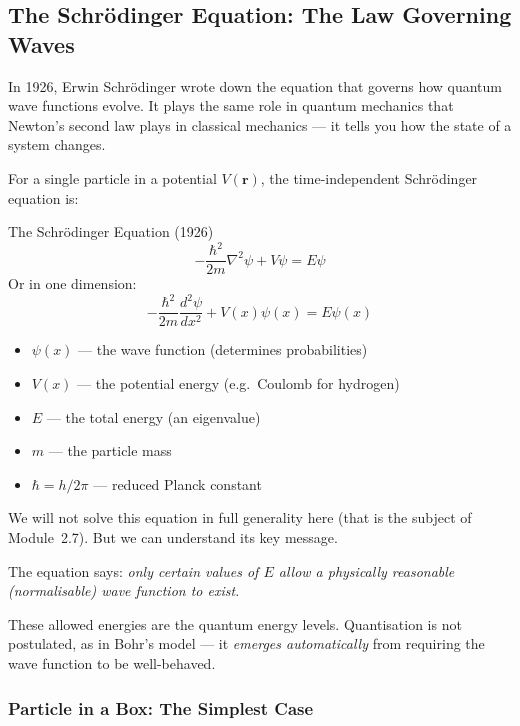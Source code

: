 \documentclass[12pt, a4paper]{book}
\begin{document}
\subsection{The Schr\"{o}dinger Equation: The Law Governing Waves}

In 1926, Erwin Schr\"{o}dinger wrote down the equation
that governs how quantum wave functions evolve.
It plays the same role in quantum mechanics that Newton's
second law plays in classical mechanics --- it tells you
how the state of a system changes.

For a single particle in a potential $V(\mathbf{r})$,
the time-independent Schr\"{o}dinger equation is:

\begin{namedconcept}{The Schr\"{o}dinger Equation (1926)}
\[
  -\frac{\hbar^2}{2m}\nabla^2\psi + V\psi = E\psi
\]
Or in one dimension:
\[
  -\frac{\hbar^2}{2m}\frac{d^2\psi}{dx^2} + V(x)\psi(x) = E\psi(x)
\]
\begin{itemize}[nosep, leftmargin=2em]
  \item $\psi(x)$ --- the wave function (determines probabilities)
  \item $V(x)$ --- the potential energy (e.g.\ Coulomb for hydrogen)
  \item $E$ --- the total energy (an eigenvalue)
  \item $m$ --- the particle mass
  \item $\hbar = h/2\pi$ --- reduced Planck constant
\end{itemize}
\end{namedconcept}

\vspace{0.5em}

We will not solve this equation in full generality here
(that is the subject of Module~2.7).
But we can understand its key message.

The equation says: \emph{only certain values of $E$ allow
a physically reasonable (normalisable) wave function to exist.}

These allowed energies are the quantum energy levels.
Quantisation is not postulated, as in Bohr's model ---
it \emph{emerges automatically} from requiring the wave
function to be well-behaved.

\subsubsection{Particle in a Box: The Simplest Case}
\end{document}
